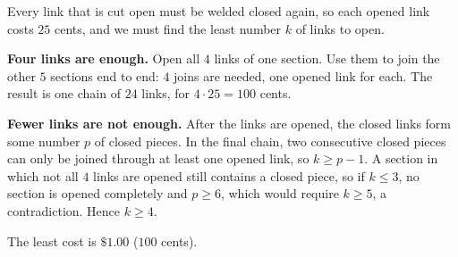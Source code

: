 Every link that is cut open must be welded closed again, so each opened link costs $25$ cents, and we must find the least number $k$ of links to open.

\textbf{Four links are enough.} Open all $4$ links of one section. Use them to join the other $5$ sections end to end: $4$ joins are needed, one opened link for each. The result is one chain of $24$ links, for $4\cdot25=100$ cents.

\textbf{Fewer links are not enough.} After the links are opened, the closed links form some number $p$ of closed pieces. In the final chain, two consecutive closed pieces can only be joined through at least one opened link, so $k\ge p-1$. A section in which not all $4$ links are opened still contains a closed piece, so if $k\le3$, no section is opened completely and $p\ge6$, which would require $k\ge5$, a contradiction. Hence $k\ge4$.

The least cost is $\boxed{\$1.00}$ ($100$ cents).
